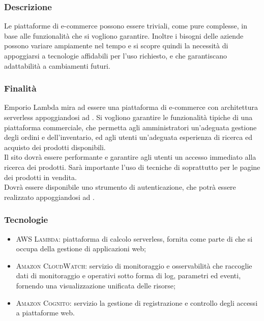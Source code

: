 \documentclass[]{article}
\begin{document}
			\subsubsection{Descrizione}
			Le piattaforme di e-commerce possono essere triviali, come pure complesse, in base alle funzionalità che si vogliono garantire. Inoltre i bisogni delle aziende possono variare ampiamente nel tempo e si scopre quindi la necessità di appoggiarsi a tecnologie affidabili per l'uso richiesto, e che garantiscano adattabilità a cambiamenti futuri.

			\subsubsection{Finalità}
			Emporio Lambda mira ad essere una piattaforma di e-commerce con architettura serverless appoggiandosi ad . Si vogliono garantire le funzionalità tipiche di una piattaforma commerciale, che permetta agli amministratori un'adeguata gestione degli ordini e dell'inventario, ed agli utenti un'adeguata esperienza di ricerca ed acquisto dei prodotti disponibili. 
			\\
			Il sito dovrà essere performante e garantire agli utenti un accesso immediato alla ricerca dei prodotti. Sarà importante l'uso di tecniche di  soprattutto per le pagine dei prodotti in vendita. 
			\\
			Dovrà essere disponibile uno strumento di autenticazione, che potrà essere realizzato appoggiandosi ad .

			\subsubsection{Tecnologie}
			\begin{itemize}
				\item \textsc{AWS Lambda:} piattaforma di calcolo serverless, fornita come parte di  che si occupa della gestione  di applicazioni web;
				\item \textsc{Amazon CloudWatch:} servizio di monitoraggio e osservabilità che raccoglie dati di monitoraggio e operativi sotto forma di log, parametri ed eventi, fornendo una visualizzazione unificata delle risorse;
				\item \textsc{Amazon Cognito:} servizio la gestione di registrazione e controllo degli accessi a piattaforme web.
			\end{itemize}
\end{document}
